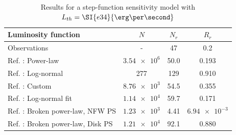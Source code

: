 \documentclass{C://Aliases//Dropbox-MIT//Latex_Templates//personal}
\begin{document}
\begin{table}
    \centering
    \begin{subtable}[h]{0.9\textwidth}
        \centering
        \begin{tabular}{|l|c|c|c|}
            \hline
            Luminosity function & $N$ & $N_r$ & $R_r$ \\ \hline
            Observations & - & 47 & 0.2 \\
            Ref. \cite{Zhong:2019ycb}: Power-law & $\num{3.54e6}$ & 50.0 & 0.193 \\
            Ref. \cite{osti_1305131}: Log-normal & 277 & 129 & 0.910 \\
            Ref. \cite{Ploeg:2020jeh}: Custom  & $\num{8.76e3}$ & 54.5 & 0.355 \\
            Ref. \cite{Ploeg:2020jeh}: Log-normal fit  & $\num{1.14e4}$ & 59.7 & 0.171 \\
            Ref. \cite{Lee:2015fea}: Broken power-law, NFW PS & $\num{1.23e3}$ & 4.41 & $\num{6.94e-3}$ \\
            Ref. \cite{Lee:2015fea}: Broken power-law, Disk PS & $\num{1.21e4}$ & 92.1 & 0.880 \\ \hline
        \end{tabular}
        \caption{Results for a step-function sensitivity model with $L_{th} = \SI{e34}{\erg\per\second}$}
        \label{tab:step}
    \end{subtable}

    \vspace{1em}


\end{table}
\end{document}
